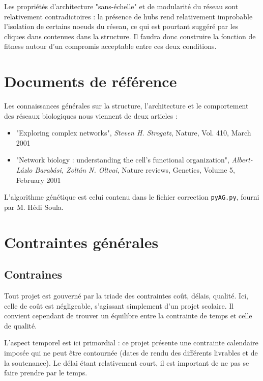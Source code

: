 \medskip
Les propriétés d'architecture "sans-échelle" et de modularité du réseau sont relativement contradictoires : la présence de hubs rend relativement improbable l'isolation de certains noeuds du réseau, ce qui est pourtant suggéré par les cliques dans contenues dans la structure. Il faudra donc construire la fonction de fitness autour d'un compromis acceptable entre ces deux conditions.

\section{Documents de référence}
Les connaissances générales sur la structure, l'architecture et le comportement des réseaux biologiques nous viennent de deux articles :

\begin{itemize}
	\item "Exploring complex networks", \textit{Steven H. Strogatz}, Nature, Vol. 410, March 2001
	\item "Network biology : understanding the cell's functional organization", \textit{Albert-L\'{a}zlo Barab\'{a}si, Zolt\'{a}n N. Oltvai}, Nature reviews, Genetics, Volume 5, February 2001\medskip
\end{itemize}


L'algorithme génétique est celui contenu dans le fichier correction \texttt{pyAG.py}, fourni par M. Hédi Soula.

\section{Contraintes générales}

\subsection{Contraines}
Tout projet est gouverné par la triade des contraintes coût, délais, qualité. Ici, celle de coût est négligeable, s'agissant simplement d'un projet scolaire. Il convient cependant de trouver un équilibre entre la contrainte de temps et celle de qualité.

L'aspect temporel est ici primordial : ce projet présente une contrainte calendaire imposée qui ne peut être contournée (dates de rendu des différents livrables et de la soutenance). Le délai étant relativement court, il est important de ne pas se faire prendre par le temps.

